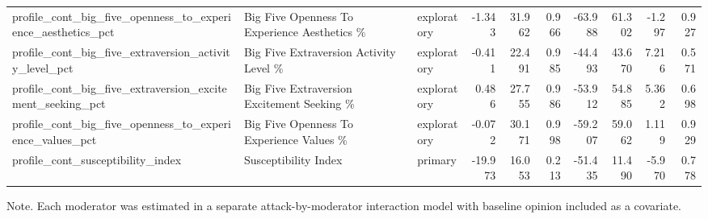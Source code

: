\begin{table}[htbp]
\begin{threeparttable}
\begin{tabular}{lllrrrrrrr}
profile\_cont\_big\_five\_openness\_to\_experience\_aesthetics\_pct & Big Five Openness To Experience Aesthetics \% & exploratory & -1.343 & 31.962 & 0.966 & -63.988 & 61.302 & -1.297 & 0.927 \\
profile\_cont\_big\_five\_extraversion\_activity\_level\_pct & Big Five Extraversion Activity Level \% & exploratory & -0.411 & 22.491 & 0.985 & -44.493 & 43.670 & 7.216 & 0.571 \\
profile\_cont\_big\_five\_extraversion\_excitement\_seeking\_pct & Big Five Extraversion Excitement Seeking \% & exploratory & 0.486 & 27.755 & 0.986 & -53.912 & 54.885 & 5.362 & 0.698 \\
profile\_cont\_big\_five\_openness\_to\_experience\_values\_pct & Big Five Openness To Experience Values \% & exploratory & -0.072 & 30.171 & 0.998 & -59.207 & 59.062 & 1.119 & 0.929 \\
profile\_cont\_susceptibility\_index & Susceptibility Index & primary & -19.973 & 16.053 & 0.213 & -51.435 & 11.490 & -5.970 & 0.778 \\
\bottomrule
\end{tabular}

\begin{tablenotes}[flushleft]\footnotesize\item Note. Each moderator was estimated in a separate attack-by-moderator interaction model with baseline opinion included as a covariate.\end{tablenotes}
\end{threeparttable}
\end{table}